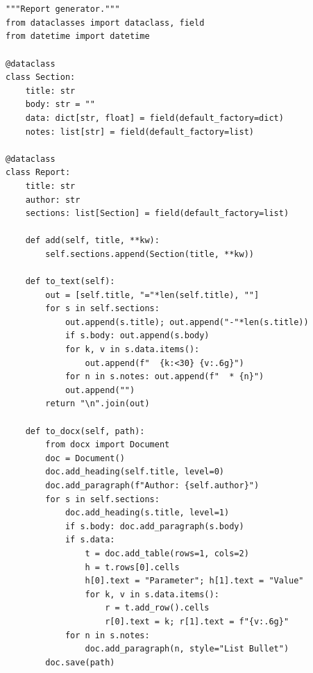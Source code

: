 \documentclass[10pt,a4paper,openany]{book}
\begin{document}
\chapter{}
\begin{lstlisting}
"""Report generator."""
from dataclasses import dataclass, field
from datetime import datetime

@dataclass
class Section:
    title: str
    body: str = ""
    data: dict[str, float] = field(default_factory=dict)
    notes: list[str] = field(default_factory=list)

@dataclass
class Report:
    title: str
    author: str
    sections: list[Section] = field(default_factory=list)

    def add(self, title, **kw):
        self.sections.append(Section(title, **kw))

    def to_text(self):
        out = [self.title, "="*len(self.title), ""]
        for s in self.sections:
            out.append(s.title); out.append("-"*len(s.title))
            if s.body: out.append(s.body)
            for k, v in s.data.items():
                out.append(f"  {k:<30} {v:.6g}")
            for n in s.notes: out.append(f"  * {n}")
            out.append("")
        return "\n".join(out)

    def to_docx(self, path):
        from docx import Document
        doc = Document()
        doc.add_heading(self.title, level=0)
        doc.add_paragraph(f"Author: {self.author}")
        for s in self.sections:
            doc.add_heading(s.title, level=1)
            if s.body: doc.add_paragraph(s.body)
            if s.data:
                t = doc.add_table(rows=1, cols=2)
                h = t.rows[0].cells
                h[0].text = "Parameter"; h[1].text = "Value"
                for k, v in s.data.items():
                    r = t.add_row().cells
                    r[0].text = k; r[1].text = f"{v:.6g}"
            for n in s.notes:
                doc.add_paragraph(n, style="List Bullet")
        doc.save(path)


\end{lstlisting}
\end{document}
